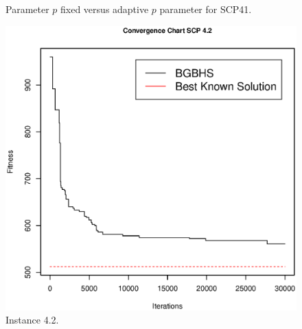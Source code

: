 \begin{figure}[htp] 
    \centering
    \hfill%
        \caption{Parameter $p$ fixed versus adaptive $p$ parameter for SCP41.}
        \label{fig:Instance.4.1}
\end{figure}


\begin{figure}[]
\centering
\includegraphics[scale=.45]{Resultados/scp42.eps}
\caption{Instance 4.2.}
\label{fig:Instance.4.2}
\end{figure}

